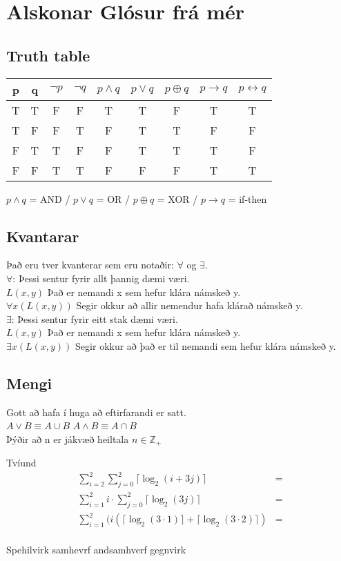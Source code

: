 \section*{Alskonar Glósur frá mér}
\subsection*{Truth table}
\begin{center}
    \begin{tabular}{ c|c|c|c|c|c|c|c|c }
        p & q & $\lnot p$ & $\lnot q$ & $p \wedge q$ & $p \vee q$ & $p \oplus q$ & $p \to q$ & $p \leftrightarrow q$
        \\ \hline
        T & T & F & F & T & T & F & T & T
        \\ \hline
        T & F & F & T & F & T & T & F & F
        \\ \hline
        F & T & T & F & F & T & T & T & F
        \\ \hline
        F & F & T & T & F & F & F & T & T
    \end{tabular}
\end{center}
$p \wedge q$ = AND / $p \vee q$ = OR / $p \oplus q$ = XOR / $p \to q$ = if-then
\subsection*{Kvantarar}
Það eru tver kvanterar sem eru notaðir: $\forall$ og $\exists$.\\
$\forall$: Þessi sentur fyrir allt þannig dæmi væri.\\
\indent $L(x,y)$ Það er nemandi x sem hefur klára námskeð y.\\
\indent $\forall x (L(x,y))$ Segir okkur að allir nemendur hafa klárað námskeð y.\\
$\exists$: Þessi sentur fyrir eitt stak dæmi væri.\\
\indent $L(x,y)$ Það er nemandi x sem hefur klára námskeð y.\\
\indent $\exists x (L(x,y))$ Segir okkur að það er til nemandi sem hefur klára námskeð y.
\subsection*{Mengi}
Gott að hafa í huga að eftirfarandi er satt.\\
$A \vee B \equiv A \cup B$ \quad $A \wedge B \equiv A \cap B$\\

Þýðir að n er jákvæð heiltala $n \in \mathbb{Z}_+$ 

Tvíund\\

\begin{align*}
    \displaystyle \sum_{i = 2}^{2} \sum_{j=0}^{2} \lceil \log_2(i+3j)\rceil &= \\
    \displaystyle \sum_{i=1}^{2} i \cdot \sum_{j=0}^{2} \lceil \log_2(3j)\rceil &= \\
    \displaystyle \sum_{i=1}^{2}(i(\lceil \log_2(3\cdot1)\rceil + \lceil \log_2(3\cdot2)\rceil) &= \\
\end{align*}

Spehilvirk 
samhevrf
andsamhverf
gegnvirk
\newpage